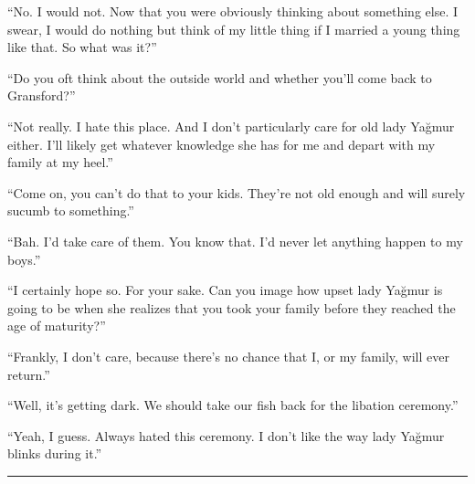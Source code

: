 ``No. I would not. Now that you were obviously thinking about something else. I swear, I would do
nothing but think of my little thing if I married a young thing like that. So what was it?''

``Do you oft think about the outside world and whether you'll come back to Gransford?''

``Not really. I hate this place. And I don't particularly care for old lady Yağmur either. I'll
likely get whatever knowledge she has for me and depart with my family at my heel.''

``Come on, you can't do that to your kids. They're not old enough and will surely sucumb to
something.''

``Bah. I'd take care of them. You know that. I'd never let anything happen to my boys.''

``I certainly hope so. For your sake. Can you image how upset lady Yağmur is going to be when she
realizes that you took your family before they reached the age of maturity?''

``Frankly, I don't care, because there's no chance that I, or my family, will ever return.''

``Well, it's getting dark. We should take our fish back for the libation ceremony.''

``Yeah, I guess. Always hated this ceremony. I don't like the way lady Yağmur blinks during it.''

\noindent\rule{\textwidth}{1pt}


